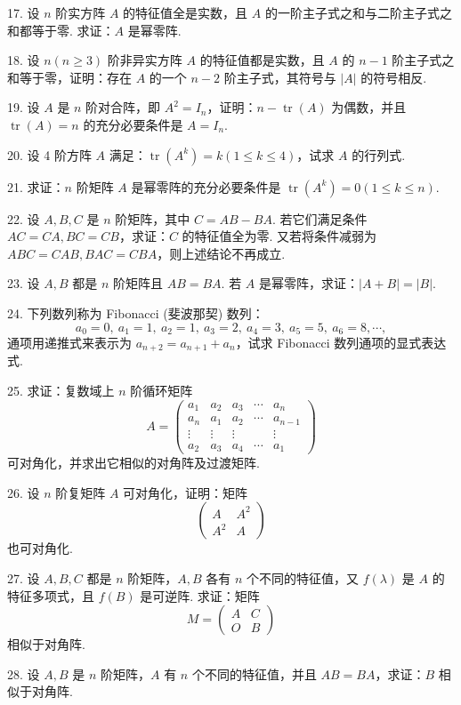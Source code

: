 \documentclass[UTF8,12pt,a4paper,fontset=fandol]{ctexart}
\begin{document}
17. 设 $n$ 阶实方阵 $A$ 的特征值全是实数，且 $A$ 的一阶主子式之和与二阶主子式之和都等于零. 求证：$A$ 是幂零阵.

18. 设 $n(n\geq 3)$ 阶非异实方阵 $A$ 的特征值都是实数，且 $A$ 的 $n-1$ 阶主子式之和等于零，证明：存在 $A$ 的一个 $n-2$ 阶主子式，其符号与 $|A|$ 的符号相反.

19. 设 $A$ 是 $n$ 阶对合阵，即 $A^2=I_n$，证明：$n-\operatorname{tr}(A)$ 为偶数，并且 $\operatorname{tr}(A)=n$ 的充分必要条件是 $A=I_n$.

20. 设 4 阶方阵 $A$ 满足：$\operatorname{tr}(A^k)=k(1\leq k\leq 4)$，试求 $A$ 的行列式.

21. 求证：$n$ 阶矩阵 $A$ 是幂零阵的充分必要条件是 $\operatorname{tr}(A^k)=0(1\leq k\leq n)$.

22. 设 $A,B,C$ 是 $n$ 阶矩阵，其中 $C=AB-BA$. 若它们满足条件 $AC=CA,BC=CB$，求证：$C$ 的特征值全为零. 又若将条件减弱为 $ABC=CAB,BAC=CBA$，则上述结论不再成立.

23. 设 $A,B$ 都是 $n$ 阶矩阵且 $AB=BA$. 若 $A$ 是幂零阵，求证：$|A+B|=|B|$.

24. 下列数列称为 Fibonacci (斐波那契) 数列：
\[
a_0=0,\ a_1=1,\ a_2=1,\ a_3=2,\ a_4=3,\ a_5=5,\ a_6=8,\cdots,
\]
通项用递推式来表示为 $a_{n+2}=a_{n+1}+a_n$，试求 Fibonacci 数列通项的显式表达式.

25. 求证：复数域上 $n$ 阶循环矩阵
\[
A=\left(\begin{array}{ccccc}
a_1 & a_2 & a_3 & \cdots & a_n\\
a_n & a_1 & a_2 & \cdots & a_{n-1}\\
\vdots & \vdots & \vdots & & \vdots\\
a_2 & a_3 & a_4 & \cdots & a_1
\end{array}\right)
\]
可对角化，并求出它相似的对角阵及过渡矩阵.

26. 设 $n$ 阶复矩阵 $A$ 可对角化，证明：矩阵
\[
\left(\begin{array}{cc}
A & A^2\\
A^2 & A
\end{array}\right)
\]
也可对角化.

27. 设 $A,B,C$ 都是 $n$ 阶矩阵，$A,B$ 各有 $n$ 个不同的特征值，又 $f(\lambda)$ 是 $A$ 的特征多项式，且 $f(B)$ 是可逆阵. 求证：矩阵
\[
M=\left(\begin{array}{cc}
A & C\\
O & B
\end{array}\right)
\]
相似于对角阵.

28. 设 $A,B$ 是 $n$ 阶矩阵，$A$ 有 $n$ 个不同的特征值，并且 $AB=BA$，求证：$B$ 相似于对角阵.
\end{document}
